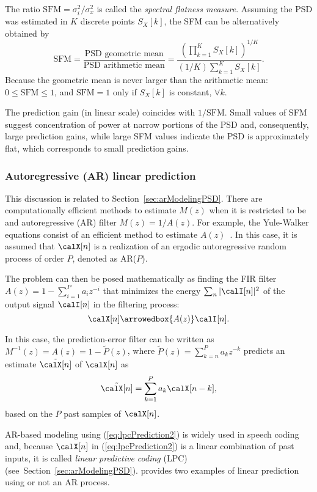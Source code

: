 The ratio $\textrm{SFM}={\sigma_i^2}/{\sigma_x^2}$ is called the \emph{spectral flatness measure}. 
Assuming the PSD was estimated in $K$ discrete points $S_X[k]$, the SFM can be alternatively obtained by
\begin{equation}
\textrm{SFM} = \frac{\textrm{PSD geometric mean}}{\textrm{PSD arithmetic mean}} = \frac{\left(\prod_{k=1}^K S_X[k]\right)^{1/K}}{(1/K) \sum_{k=1}^K S_X[k]}.
\label{eq:sfm}
\end{equation}
Because the geometric mean is never larger than the arithmetic mean: $0 \le \textrm{SFM} \le 1$, and $\textrm{SFM}=1$ only if $S_X[k]$ is constant, $\forall k$.

The prediction gain (in linear scale) coincides with $1/\textrm{SFM}$. Small values of SFM suggest concentration of power at narrow portions of the PSD and, consequently,
large prediction gains,
while large SFM values indicate the PSD is approximately flat, which corresponds to small prediction
gains.

\subsubsection{Autoregressive (AR) linear prediction}

This discussion is related to Section~\ref{sec:arModelingPSD}.
There are computationally efficient methods to estimate $M(z)$ when it is restricted to be and autoregressive (AR) filter $M(z)=1/A(z)$. For example, the Yule-Walker equations consist of an efficient method to estimate $A(z)$~\cite{Haykin01}.
In this case, it is assumed that $\calX[n]$ is a realization of an ergodic autoregressive random process of order $P$, denoted as AR($P$).

The problem can then be posed mathematically as finding the FIR filter  $A(z) =1-\sum_{i=1}^P a_i z^{-i}$ that minimizes the energy $\sum_n |\calI[n]|^2$ of the output signal $\calI[n]$ in the filtering process:
\[
\calX[n] \arrowedbox{A(z)} \calI[n].
\]

In this case, the prediction-error filter can be written as $M^{-1}(z) = A(z)=1-\tilde P(z)$, where $\tilde P(z)=\sum_{k=n}^P a_k z^{-k}$ predicts an estimate $\tilde \calX[n]$ of $\calX[n]$ as
\begin{equation}
\tilde \calX[n] = \sum_{k=1}^P a_k \calX[n-k],
\label{eq:lpcPrediction2}
\end{equation}
based on the $P$ past samples of $\calX[n]$.

AR-based modeling using (\ref{eq:lpcPrediction2}) is widely used in speech coding and, because $\calX[n]$ in (\ref{eq:lpcPrediction2}) is a linear combination of past inputs, 
it is called \emph{linear predictive coding} (LPC) (see~Section~\ref{sec:arModelingPSD}).
provides two examples of linear prediction using or not an AR process.

